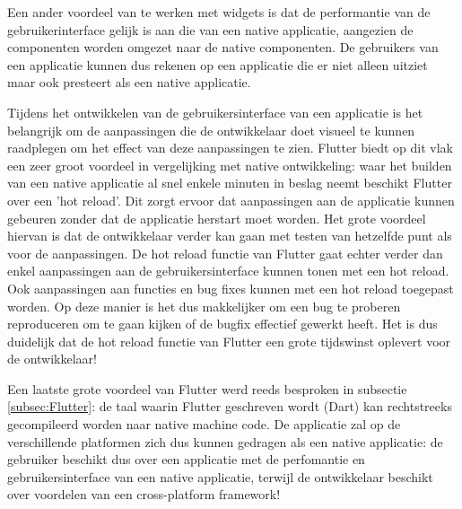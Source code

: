 Een ander voordeel van te werken met widgets is dat de performantie van de gebruikerinterface gelijk is aan die van een native applicatie, aangezien de componenten worden omgezet naar de native componenten. De gebruikers van een applicatie kunnen dus rekenen op een applicatie die er niet alleen uitziet maar ook presteert als een native applicatie.

Tijdens het ontwikkelen van de gebruikersinterface van een applicatie is het belangrijk om de aanpassingen die de ontwikkelaar doet visueel te kunnen raadplegen om het effect van deze aanpassingen te zien. Flutter biedt op dit vlak een zeer groot voordeel in vergelijking met native ontwikkeling: waar het builden van een native applicatie al snel enkele minuten in beslag neemt beschikt Flutter over een 'hot reload'. Dit zorgt ervoor dat aanpassingen aan de applicatie kunnen gebeuren zonder dat de applicatie herstart moet worden. Het grote voordeel hiervan is dat de ontwikkelaar verder kan gaan met testen van hetzelfde punt als voor de aanpassingen. De hot reload functie van Flutter gaat echter verder dan enkel aanpassingen aan de gebruikersinterface kunnen tonen met een hot reload. Ook aanpassingen aan functies en bug fixes kunnen met een hot reload toegepast worden. Op deze manier is het dus makkelijker om een bug te proberen reproduceren om te gaan kijken of de bugfix effectief gewerkt heeft. Het is dus duidelijk dat de hot reload functie van Flutter een grote tijdswinst oplevert voor de ontwikkelaar!

Een laatste grote voordeel van Flutter werd reeds besproken in subsectie \ref{subsec:Flutter}: de taal waarin Flutter geschreven wordt (Dart) kan rechtstreeks gecompileerd worden naar native machine code. De applicatie zal op de verschillende platformen zich dus kunnen gedragen als een native applicatie: de gebruiker beschikt dus over een applicatie met de perfomantie en gebruikersinterface van een native applicatie, terwijl de ontwikkelaar beschikt over voordelen van een cross-platform framework!
